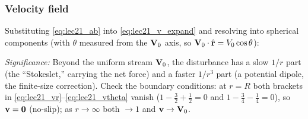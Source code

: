 \documentclass[../main.tex]{subfiles}
\begin{document}
\subsubsection*{Velocity field}
Substituting \eqref{eq:lec21_ab} into \eqref{eq:lec21_v_expand} and resolving into spherical components (with $\theta$ measured from the $\mathbf{V}_0$ axis, so $\mathbf{V}_0\cdot\hat{\mathbf{r}}=V_0\cos\theta$):

\textit{Significance:} Beyond the uniform stream $\mathbf{V}_0$, the disturbance has a slow $1/r$ part (the ``Stokeslet,'' carrying the net force) and a faster $1/r^3$ part (a potential dipole, the finite-size correction). Check the boundary conditions: at $r=R$ both brackets in \eqref{eq:lec21_vr}--\eqref{eq:lec21_vtheta} vanish ($1-\tfrac32+\tfrac12=0$ and $1-\tfrac34-\tfrac14=0$), so $\mathbf{v}=\mathbf{0}$ (no-slip); as $r\to\infty$ both $\to1$ and $\mathbf{v}\to\mathbf{V}_0$.
\end{document}
